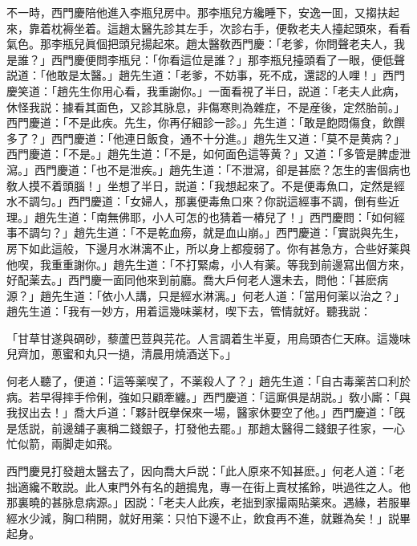不一時，西門慶陪他進入李瓶兒房中。那李瓶兒方纔睡下，安逸一囬，又搊扶起來，靠着枕褥坐着。這趙太醫先診其左手，次診右手，便敎老夫人擡起頭來，看看氣色。那李瓶兒眞個把頭兒揚起來。趙太醫敎西門慶：「老爹，你問聲老夫人，我是誰？」西門慶便問李瓶兒：「你看這位是誰？」那李瓶兒擡頭看了一眼，便低聲説道：「他敢是太醫。」趙先生道：「老爹，不妨事，死不成，還認的人哩！」西門慶笑道：「趙先生你用心看，我重謝你。」一面看視了半日，説道：「老夫人此病，休怪我説：據看其面色，又診其脉息，非傷寒則為雜症，不是産後，定然胎前。」西門慶道：「不是此疾。先生，你再仔細診一診。」先生道：「敢是飽悶傷食，飲饌多了？」西門慶道：「他連日飯食，通不十分進。」趙先生又道：「莫不是黄病？」西門慶道：「不是。」趙先生道：「不是，如何面色這等黄？」又道：「多管是脾虚泄瀉。」西門慶道：「也不是泄疾。」趙先生道：「不泄瀉，卻是甚麽？怎生的害個病也敎人摸不着頭腦！」坐想了半日，説道：「我想起來了。不是便毒魚口，定然是經水不調匀。」西門慶道：「女婦人，那裏便毒魚口來？你説這經事不調，倒有些近理。」趙先生道：「南無佛耶，小人可怎的也猜着一樁兒了！」西門慶問：「如何經事不調匀？」趙先生道：「不是乾血癆，就是血山崩。」西門慶道：「實説與先生，房下如此這般，下邊月水淋漓不止，所以身上都瘦弱了。你有甚急方，合些好薬與他喫，我重重謝你。」趙先生道：「不打緊䖏，小人有薬。等我到前邊寫出個方來，好配薬去。」西門慶一面同他來到前廳。喬大戶何老人還未去，問他：「甚麽病源？」趙先生道：「依小人講，只是經水淋漓。」何老人道：「當用何薬以治之？」趙先生道：「我有一妙方，用着這幾味薬材，喫下去，管情就好。聽我説：

\begin{myquote}
「甘草甘遂與碙砂，藜蘆巴荳與芫花。人言調着生半夏，用烏頭杏仁天麻。這幾味兒齊加，蔥蜜和丸只一撾，清晨用燒酒送下。」
\end{myquote}

何老人聽了，便道：「這等薬喫了，不薬殺人了？」趙先生道：「自古毒薬苦口利於病。若早得摔手伶俐，強如只顧牽纏。」西門慶道：「這廝俱是胡説。」敎小廝：「與我扠出去！」喬大戶道：「夥計旣擧保來一場，醫家休要空了他。」西門慶道：「旣是恁説，前邊舖子裏稱二錢銀子，打發他去罷。」那趙太醫得二錢銀子徃家，一心忙似箭，兩脚走如飛。

西門慶見打發趙太醫去了，因向喬大戶説：「此人原來不知甚麽。」何老人道：「老拙適纔不敢説。此人東門外有名的趙搗鬼，專一在街上賣杖搖鈴，哄過徃之人。他那裏曉的甚脉息病源。」因説：「老夫人此疾，老拙到家撮兩貼薬來。遇緣，若服畢經水少減，胸口稍開，就好用薬：只怕下邊不止，飲食再不進，就難為矣！」説畢起身。

